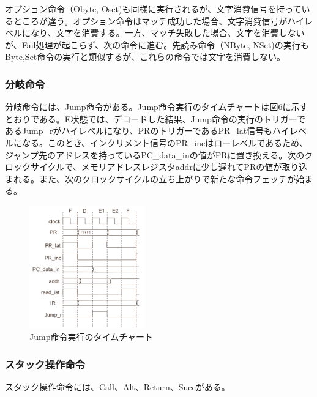 \documentclass[submit]{ipsj}
\begin{document}
オプション命令（Obyte, Oset)も同様に実行されるが、文字消費信号を持っているところが違う。オプション命令はマッチ成功した場合、文字消費信号がハイレベルになり、文字を消費する。一方、マッチ失敗した場合、文字を消費しないが、Fail処理が起こらず、次の命令に進む。先読み命令（NByte, NSet)の実行もByte,Set命令の実行と類似するが、これらの命令では文字を消費しない。\\

\subsubsection{分岐命令}

分岐命令には、Jump命令がある。Jump命令実行のタイムチャートは図6に示すとおりである。E状態では、デコードした結果、Jump命令の実行のトリガーであるJump\_rがハイレベルになり、PRのトリガーであるPR\_lat信号もハイレベルになる。このとき、インクリメント信号のPR\_incはローレベルであるため、ジャンプ先のアドレスを持っているPC\_data\_inの値がPRに置き換える。次のクロックサイクルで、メモリアドレスレジスタaddrに少し遅れてPRの値が取り込まれる。また、次のクロックサイクルの立ち上がりで新たな命令フェッチが始まる。


\begin{figure}[h]
    \begin{center}
        \includegraphics[width=50mm]{./fig/Jump}
       \caption{Jump命令実行のタイムチャート}
    \end{center}
\end{figure}

\subsubsection{スタック操作命令}
スタック操作命令には、Call、Alt、Return、Succがある。
\end{document}
